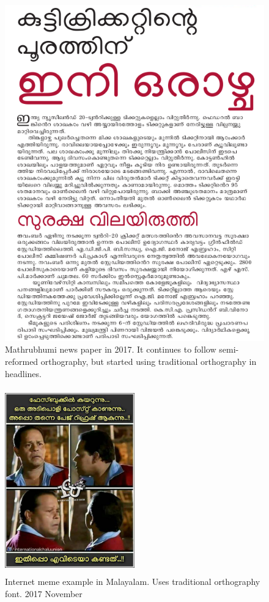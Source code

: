 \documentclass[10pt]{article}
\begin{document}
\begin{figure}[H]
	\centering
	\includegraphics[scale=0.4]{images/2017-Mathrubhumi-newspaper.png}
	\caption{Mathrubhumi news paper in 2017. It continues to follow semi-reformed orthography, but started using traditional orthography in headlines.}
\end{figure}

\begin{figure}[H]
	\centering
	\includegraphics[width=0.5\textwidth, height=8cm]{images/2017-icu-meme.jpg}
	\caption{Internet meme example in Malayalam. Uses traditional orthography font. 2017 November}
	\label{meme}
\end{figure}
\end{document}
